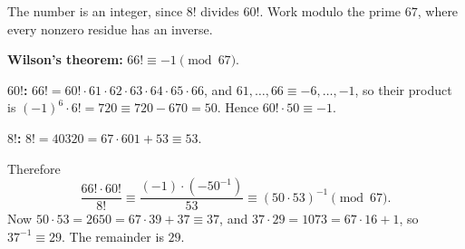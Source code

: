 The number is an integer, since $8!$ divides $60!$. Work modulo the prime $67$, where every nonzero residue has an inverse.

\textbf{Wilson's theorem:} $66!\equiv-1\pmod{67}$.

\textbf{$60!$:} $66!=60!\cdot61\cdot62\cdot63\cdot64\cdot65\cdot66$, and $61,\dots,66\equiv-6,\dots,-1$, so their product is $(-1)^6\cdot6!=720\equiv720-670=50$. Hence $60!\cdot50\equiv-1$.

\textbf{$8!$:} $8!=40320=67\cdot601+53\equiv53$.

Therefore
\[\dfrac{66!\cdot60!}{8!}\equiv\dfrac{(-1)\cdot\left(-50^{-1}\right)}{53}\equiv(50\cdot53)^{-1}\pmod{67}.\]
Now $50\cdot53=2650=67\cdot39+37\equiv37$, and $37\cdot29=1073=67\cdot16+1$, so $37^{-1}\equiv29$. The remainder is $\boxed{29}$.
